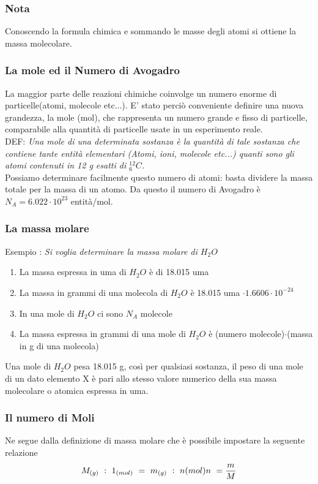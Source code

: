 \documentclass{article}
\begin{document}
\subsubsection*{Nota}
Conoscendo la formula chimica e sommando le masse degli atomi si ottiene la massa molecolare.
\subsubsection{La mole ed il Numero di Avogadro}
La maggior parte delle reazioni chimiche coinvolge un numero enorme di particelle(atomi, molecole etc...).
E' stato perciò conveniente definire una nuova grandezza, la mole (mol), che rappresenta un numero grande e 
fisso di particelle, comparabile alla quantità di particelle usate in un esperimento reale.\\
DEF: \textit{Una mole di una determinata sostanza è la quantità di tale sostanza che contiene tante
entità elementari (Atomi, ioni, molecole etc...) quanti sono gli atomi contenuti in 12 g esatti di $^{12}_6C$.}\\ 
Possiamo determinare facilmente questo numero di atomi: basta dividere la massa totale per la massa di un atomo.
Da questo il numero di Avogadro è
\\ $N_A = 6.022\cdot 10^{23}$ entità/mol.\\
\subsubsection{La massa molare}
Esempio : \textit{Si voglia determinare la massa molare di $H_2O$}
\begin{enumerate}
    \item La massa espressa in uma di $H_2O$ è di 18.015 uma  
    \item La massa in grammi di una molecola di $H_2O$ è 18.015 uma  $\cdot 1.6606\cdot 10^{-24}$
    \item In una mole di $H_2O$ ci sono $N_A$ molecole
    \item La massa espressa in grammi di una mole di $H_2O$ è (numero molecole)$\cdot$(massa in g di una molecola)
\end{enumerate}
Una mole di $H_2O$ pesa 18.015 g, così per qualsiasi sostanza, il peso di una mole di un dato elemento X
è pari allo stesso valore numerico della sua massa molecolare o atomica espressa in uma.

\subsubsection*{Il numero di Moli}
Ne segue dalla definizione di massa molare che è possibile impostare la seguente relazione
\begin{equation*}
    M_{(g)} \ : \ 1_{(mol)} \ = \ m_{(g)} \ :\ n{(mol)} \\
    n \ = \frac{m}{M}
\end{equation*}
\end{document}
